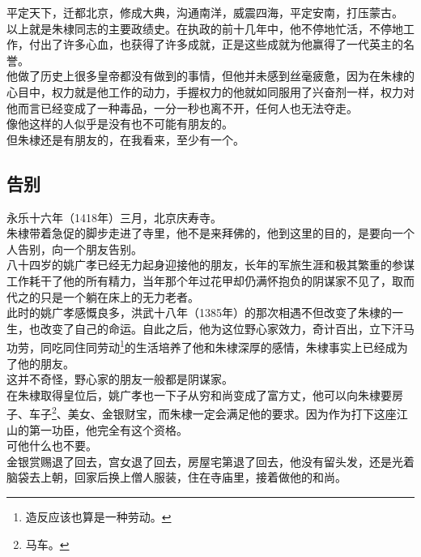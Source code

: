 	\begin{multicols}{\theparacolNo}
\fi
平定天下，迁都北京，修成大典，沟通南洋，威震四海，平定安南，打压蒙古。\\

以上就是朱棣同志的主要政绩史。在执政的前十几年中，他不停地忙活，不停地工作，付出了许多心血，也获得了许多成就，正是这些成就为他赢得了一代英主的名誉。\\

他做了历史上很多皇帝都没有做到的事情，但他并未感到丝毫疲惫，因为在朱棣的心目中，权力就是他工作的动力，手握权力的他就如同服用了兴奋剂一样，权力对他而言已经变成了一种毒品，一分一秒也离不开，任何人也无法夺走。\\

像他这样的人似乎是没有也不可能有朋友的。\\

但朱棣还是有朋友的，在我看来，至少有一个。\\

\subsection{告别}
永乐十六年（1418年）三月，北京庆寿寺。\\

朱棣带着急促的脚步走进了寺里，他不是来拜佛的，他到这里的目的，是要向一个人告别，向一个朋友告别。\\

八十四岁的姚广孝已经无力起身迎接他的朋友，长年的军旅生涯和极其繁重的参谋工作耗干了他的所有精力，当年那个年过花甲却仍满怀抱负的阴谋家不见了，取而代之的只是一个躺在床上的无力老者。\\

此时的姚广孝感慨良多，洪武十八年（1385年）的那次相遇不但改变了朱棣的一生，也改变了自己的命运。自此之后，他为这位野心家效力，奇计百出，立下汗马功劳，同吃同住同劳动\footnote{造反应该也算是一种劳动。}的生活培养了他和朱棣深厚的感情，朱棣事实上已经成为了他的朋友。\\

这并不奇怪，野心家的朋友一般都是阴谋家。\\

在朱棣取得皇位后，姚广孝也一下子从穷和尚变成了富方丈，他可以向朱棣要房子、车子\footnote{马车。}、美女、金银财宝，而朱棣一定会满足他的要求。因为作为打下这座江山的第一功臣，他完全有这个资格。\\

可他什么也不要。\\

金银赏赐退了回去，宫女退了回去，房屋宅第退了回去，他没有留头发，还是光着脑袋去上朝，回家后换上僧人服装，住在寺庙里，接着做他的和尚。\\


\end{multicols}
